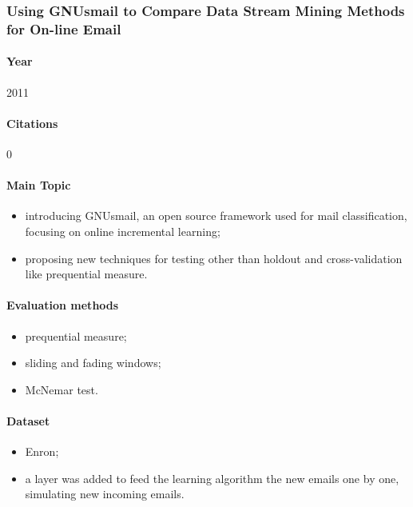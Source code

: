 \documentclass[12pt]{article}
\begin{document}

\subsubsection{Using GNUsmail to Compare Data Stream Mining Methods for On-line Email \cite{JOSE11}}
\paragraph{Year} 2011

\paragraph{Citations} 0

\paragraph{Main Topic}
\begin{itemize}
    \item introducing GNUsmail, an open source framework used for mail 
	  classification, focusing on online incremental learning;
    \item proposing new techniques for testing other than holdout and 
	  cross-validation like prequential measure.
\end{itemize}

\paragraph{Evaluation methods}
\begin{itemize}
    \item prequential measure;
    \item sliding and fading windows;
    \item McNemar test.
\end{itemize}

\paragraph{Dataset}
\begin{itemize}
    \item Enron;
    \item a layer was added to feed the learning algorithm the new emails one 
	  by one, simulating new incoming emails.
\end{itemize}
\end{document}
